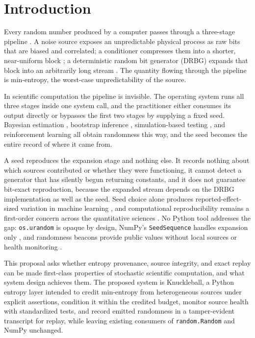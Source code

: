 \section{Introduction}
 
Every random number produced by a computer passes through a three-stage pipeline
\citep{turan2018,barker2015}. A noise source exposes an unpredictable physical
process as raw bits that are biased and correlated; a conditioner compresses them into a
shorter, near-uniform block \citep{vonneumann1951,impagliazzo1989}; a deterministic
random bit generator (DRBG) expands that block into an arbitrarily long stream
\citep{matsumoto1998,oneill2014}. The quantity flowing through the pipeline is
min-entropy, the worst-case unpredictability of the source.
 
In scientific computation the pipeline is invisible. The operating system runs all three
stages inside one system call, and the practitioner either consumes its output directly
or bypasses the first two stages by supplying a fixed seed. Bayesian estimation
\citep{geweke1999}, bootstrap inference \citep{kilian1998}, simulation-based testing
\citep{diebold1995}, and reinforcement learning \citep{henderson2018} all obtain
randomness this way, and the seed becomes the entire record of where it came from.
 
A seed reproduces the expansion stage and nothing else. It records nothing about which
sources contributed or whether they were functioning, it cannot detect a generator that
has silently begun returning constants, and it does not guarantee bit-exact
reproduction, because the expanded stream depends on the DRBG implementation as well as
the seed. Seed choice alone produces reported-effect-sized variation in machine
learning \citep{henderson2018,agarwal2021}, and computational reproducibility remains a
first-order concern across the quantitative sciences \citep{peng2011,stodden2016}. No
Python tool addresses the gap: \texttt{os.urandom} is opaque by design, NumPy's
\texttt{SeedSequence} handles expansion only \citep{harris2020}, and randomness beacons
provide public values without local sources or health monitoring
\citep{syta2017,kelsey2019}.
 
This proposal asks whether entropy provenance, source integrity, and exact replay can be
made first-class properties of stochastic scientific computation, and what system design
achieves them. The proposed system is Knuckleball, a Python entropy layer intended to
credit min-entropy from heterogeneous sources under explicit assertions, condition it
within the credited budget, monitor source health with standardized tests, and record
emitted randomness in a tamper-evident transcript for replay, while leaving existing
consumers of \texttt{random.Random} and NumPy unchanged.
 